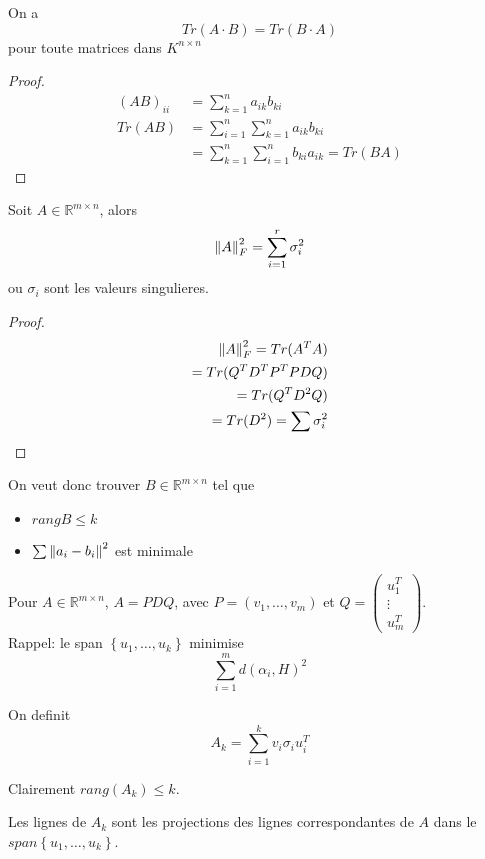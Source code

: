 \documentclass[../main.tex]{subfiles}
\begin{document}
\begin{lemma}
On a 
\[ 
	Tr( A\cdot B) = Tr( B\cdot A) 
\]
pour toute matrices dans $K^{n\times n}$
\end{lemma}
\begin{proof}
	\begin{align*}
		( AB) _{ii} &= \sum_{k=1}^{ n}a_{ik} b_{ki} \\
		Tr( AB) &= \sum_{i=1}^{ n} \sum_{k=1}^{ n}a_{ik} b_{ki} \\
		&= \sum_{k=1}^{ n} \sum_{i=1}^{ n} b_{ki} a_{ik} =Tr ( BA) 
	\end{align*}
	

\end{proof}
\begin{lemma}
Soit $A \in \mathbb{R}^{m\times n}$, alors
\[ 
\left\lVert A\right\rVert _F ^{2} = \sum_{i=1}^{ r} \sigma_i ^{2}
\]
ou $\sigma_i$ sont les valeurs singulieres.
\end{lemma}
\begin{proof}
\begin{align*}
	\left\lVert A\right\rVert _F^{2} = Tr( A^{T}A) \\
	= Tr ( Q^{T} D^{T}P^{T}P D Q) \\
	= Tr( Q^{T}D^{2}Q) \\
	= Tr ( D^{2}) = \sum \sigma_i^{2}
\end{align*}

\end{proof}
On veut donc trouver $B\in \mathbb{R}^{m\times n}$ tel que 
\begin{itemize}
\item $rang B \leq k$ 
\item $\sum \left\lVert a_i -b_i\right\rVert^{2} $ est minimale
\end{itemize}
Pour $A \in \mathbb{R}^{m\times n}$, $A= PDQ$, avec $P= ( v_1,\ldots,v_m) $ et $Q = \begin{pmatrix}
u_1^{T}\\ \vdots\\ u_m^{T}
\end{pmatrix} $.\\
Rappel: le span $ \left\{ u_1,\ldots,u_k \right\} $ minimise
\[ 
	\sum_{i=1}^{ m}d( \alpha_i,H) ^{2}
\]
\begin{defn}
	On definit
	\[ 
	A_k = \sum_{i=1}^{ k}v_i \sigma_i u_{i} ^{T}
	\]
\end{defn}
Clairement $rang ( A_k ) \leq k$.
\begin{lemma}
	Les lignes de $A_k$ sont les projections des lignes correspondantes de $A$ dans le $ span \left\{ u_1,\ldots,u_k \right\} $.\\
\end{lemma}
\end{document}
